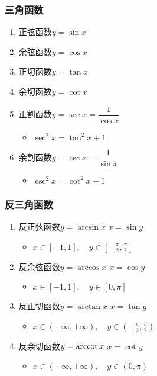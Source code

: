 \documentclass[14pt,notheorems,leqno,xcolor={rgb}]{beamer} %
\begin{document}
\begin{frame}
\frametitle{三角函数}
\begin{enumerate}[<+->]
  \item 正弦函数$y=\sin x$
  \item 余弦函数$y=\cos x$
  \item 正切函数$y=\tan x$
  \item 余切函数$y=\cot x$
  \item 正割函数$y=\sec x = \dfrac1{\cos x}$
  \begin{itemize}
    \item $\sec^2x=\tan^2x+1$
  \end{itemize}
  \item 余割函数$y=\csc x = \dfrac1{\sin x}$
  \begin{itemize}
    \item $\csc^2x=\cot^2x+1$
  \end{itemize}
\end{enumerate}
\end{frame}

\begin{frame}
\frametitle{反三角函数}
\begin{enumerate}[<+->]
  \item 反正弦函数$y=\arcsin x$ \dotfill $x=\sin y$
  \begin{itemize}
    \item $x\in[-1,1],\quad y\in[-\frac{\pi}2,\frac{\pi}2]$
  \end{itemize}
  \item 反余弦函数$y=\arccos x$ \dotfill $x=\cos y$
  \begin{itemize}
    \item $x\in[-1,1],\quad y\in[0,\pi]$
  \end{itemize}
  \item 反正切函数$y=\arctan x$ \dotfill $x=\tan y$
  \begin{itemize}
    \item $x\in(-\infty,+\infty),\quad y\in(-\frac{\pi}2,\frac{\pi}2)$
  \end{itemize}
  \item 反余切函数$y=\operatorname{arccot} x$ \dotfill $x=\cot y$
  \begin{itemize}
    \item $x\in(-\infty,+\infty),\quad y\in(0,\pi)$
  \end{itemize}
\end{enumerate}%
\end{frame}
\end{document}
